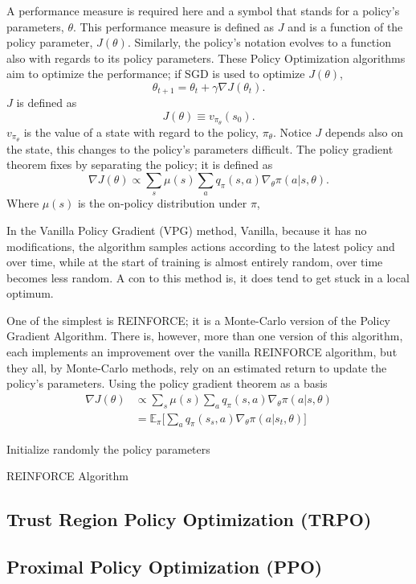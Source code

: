 A  performance measure is required here and a symbol that stands for a policy's parameters, $\theta$. This performance measure is defined as $J$ and is a function of the policy parameter, $J(\theta)$. Similarly, the policy's notation evolves to a function also with regards to its policy parameters. These Policy Optimization algorithms aim to optimize the performance; if SGD is used to optimize $J(\theta)$, $$\theta_{t+1}=\theta_t+\gamma \nabla J(\theta_t).$$ $J$ is defined as $$J(\theta)\equiv v_{\pi_{\theta}}(s_0).$$ $v_{\pi_{\theta}}$ is the value of a state with regard to the policy, $\pi_{\theta}$. Notice $J$ depends also on the state, this changes to the policy's parameters difficult. The policy gradient theorem fixes by separating the policy; it is defined as $$\nabla J(\theta)\propto \sum_s \mu(s) \sum_a q_\pi (s, a)\nabla_{\theta} \pi (a|s, \theta).$$ Where $\mu(s)$ is the on-policy distribution under $\pi$, 

In the Vanilla Policy Gradient (VPG) method, Vanilla, because it has no modifications, the algorithm samples actions according to the latest policy and over time, while at the start of training is almost entirely random, over time becomes less random. A con to this method is, it does tend to get stuck in a local optimum.

One of the simplest is REINFORCE; it is a Monte-Carlo version of the Policy Gradient Algorithm. There is, however, more than one version of this algorithm, each implements an improvement over the vanilla REINFORCE algorithm, but they all, by Monte-Carlo methods, rely on an estimated return to update the policy's parameters. Using the policy gradient theorem as a basis
\begin{align*}
	\nabla J(\theta)&\propto \sum_s \mu(s) \sum_a q_\pi (s, a)\nabla_{\theta} \pi (a|s, \theta) \\
	&=\mathbb{E}_\pi \bigg[\sum_a q_\pi(s_s, a)\nabla_\theta \pi(a|s_t, \theta)\bigg]
\end{align*}

\begin{algorithm}
	\SetAlgoLined
	\DontPrintSemicolon
	Initialize randomly the policy parameters \\
	\caption{REINFORCE Algorithm}
\end{algorithm}

\subsection{Trust Region Policy Optimization (TRPO)}

\subsection{Proximal Policy Optimization (PPO)}
